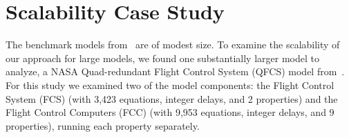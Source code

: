 \section{Scalability Case Study}

\label{sec:qfc}
The benchmark models from~\cite{expr} are of modest size.  To examine the scalability of our approach for large models, we found one substantially larger model to analyze, a NASA Quad-redundant Flight Control System (QFCS) model from~\cite{NFM2015:backes}. %
For this study we examined two of the model components: the Flight Control System (FCS) (with 3,423 equations,  integer delays, and 2 properties) and the Flight Control Computers (FCC) (with 9,953 equations,  integer delays, and 9 properties), running each property separately.  



